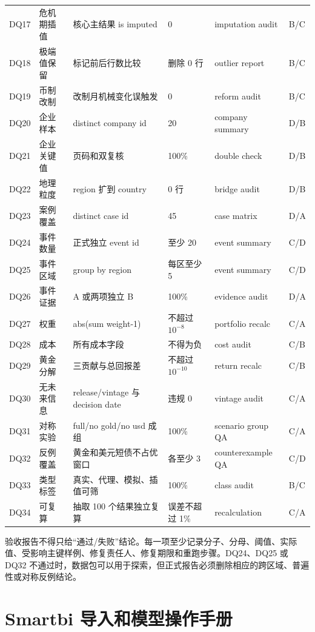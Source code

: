 \documentclass[UTF8,fontset=windows,12pt,openany]{ctexbook}
\begin{document}
\begin{landscape}
\begin{longtable}{p{1.7cm}p{4.0cm}p{4.6cm}p{3.0cm}p{3.2cm}p{2.7cm}}
DQ17 & 危机期插值 & 核心主结果 is imputed & 0 & imputation audit & B/C\\
DQ18 & 极端值保留 & 标记前后行数比较 & 删除 0 行 & outlier report & B/C\\
DQ19 & 币制改制 & 改制月机械变化误触发 & 0 & reform audit & B/C\\
DQ20 & 企业样本 & distinct company id & 20 & company summary & D/B\\
DQ21 & 企业关键值 & 页码和双复核 & 100\% & double check & D/B\\
DQ22 & 地理粒度 & region 扩到 country & 0 行 & bridge audit & D/B\\
DQ23 & 案例覆盖 & distinct case id & 45 & case matrix & D/A\\
DQ24 & 事件数量 & 正式独立 event id & 至少 20 & event summary & C/D\\
DQ25 & 事件区域 & group by region & 每区至少 5 & event summary & C/D\\
DQ26 & 事件证据 & A 或两项独立 B & 100\% & evidence audit & D/A\\
DQ27 & 权重 & abs(sum weight-1) & 不超过 \(10^{-8}\) & portfolio recalc & C/A\\
DQ28 & 成本 & 所有成本字段 & 不得为负 & cost audit & C/B\\
DQ29 & 黄金分解 & 三贡献与总回报差 & 不超过 \(10^{-10}\) & return recalc & C/B\\
DQ30 & 无未来信息 & release/vintage 与 decision date & 违规 0 & vintage audit & C/A\\
DQ31 & 对称实验 & full/no gold/no usd 成组 & 100\% & scenario group QA & C/A\\
DQ32 & 反例覆盖 & 黄金和美元短债不占优窗口 & 各至少 3 & counterexample QA & C/D\\
DQ33 & 类型标签 & 真实、代理、模拟、插值可筛 & 100\% & class audit & B/C\\
DQ34 & 可复算 & 抽取 100 个结果独立复算 & 误差不超过 1\% & recalculation & C/A\\
\bottomrule
\end{longtable}
\end{landscape}

验收报告不得只给“通过/失败”结论。每一项至少记录分子、分母、阈值、实际值、受影响主键样例、修复责任人、修复期限和重跑步骤。DQ24、DQ25 或 DQ32 不通过时，数据包可以用于探索，但正式报告必须删除相应的跨区域、普遍性或对称反例结论。

\chapter{Smartbi 导入和模型操作手册}
\end{document}
